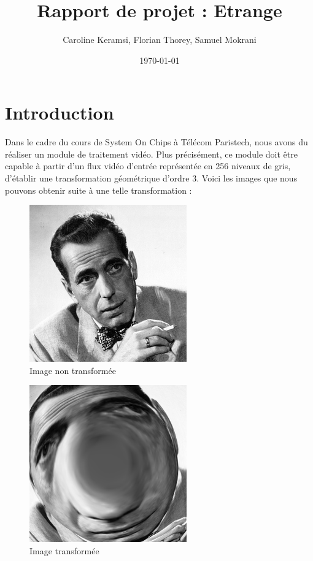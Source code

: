 \documentclass[a4paper,12pt]{report}
\title{Rapport de projet : Etrange}
\author {Caroline Keramsi, Florian Thorey, Samuel Mokrani}
\date{\today}
\begin{document}
 
\maketitle
\tableofcontents    %
\listoffigures        %
 
    \chapter*{Introduction}
{Dans le cadre du cours de System On Chips à Télécom Paristech, nous avons du réaliser
un module de traitement vidéo. Plus précisément, ce module doit être capable à partir d'un flux vidéo d'entrée représentée en 256 niveaux de gris, d'établir une transformation géométrique d'ordre 3. Voici les images que nous pouvons obtenir suite à une telle transformation :}
 
\begin{figure}[!h]
	\centering
	\includegraphics[scale = 0.5]{bogart.png}
	\caption{Image non transformée}
\end{figure}

\begin{figure}[!h]
	\centering
	\includegraphics[scale = 0.5]{bogart_tr.png}
	\caption{Image transformée}
\end{figure}
\end{document}

